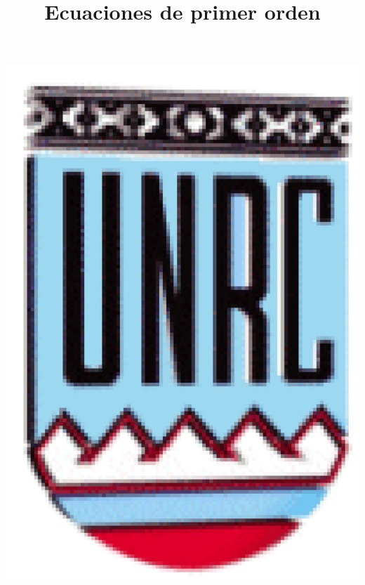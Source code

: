 \documentclass[handout,hyperref={colorlinks=true}]{beamer}
\title[Ecuaciones de primer orden] %
{%
 Ecuaciones de primer orden
}
\date{}
\begin{document}
\begin{frame}
  \maketitle
  \begin{center}
   \includegraphics[scale=0.2]{imagenes/unrc.jpg}
   \end{center}
\end{frame}





\begin{frame}
\tableofcontents
\end{frame}
\end{document}
